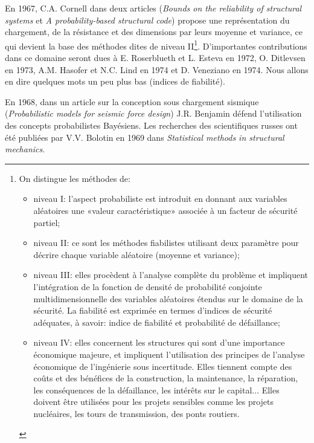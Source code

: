 \begin{histoire}
En 1967, C.A. Cornell dans deux articles (\emph{Bounds on the reliability of structural systems} et \emph{A probability-based structural code}) propose une représentation du chargement, de la résistance et des dimensions par leurs moyenne et variance, ce qui devient la base des méthodes dites de niveau II\footnote{On distingue les méthodes de:
\begin{itemize}
   \item niveau I: l'aspect probabiliste est introduit en donnant aux variables aléatoires une «valeur caractéristique» associée à un facteur de sécurité partiel;
   \item niveau II: ce sont les méthodes fiabilistes utilisant deux paramètre pour décrire chaque variable aléatoire (moyenne et variance);
   \item niveau III: elles procèdent à l'analyse complète du problème et impliquent l'intégration de la fonction de densité de probabilité conjointe multidimensionnelle des variables aléatoires étendus sur le domaine de la sécurité. La fiabilité est exprimée en termes d'indices de sécurité adéquates, à savoir: indice de fiabilité et probabilité de défaillance;
   \item niveau IV: elles concernent les structures qui sont d'une importance économique majeure, et impliquent l'utilisation des principes de l'analyse économique de l'ingénierie sous incertitude. Elles tiennent compte des coûts et des bénéfices de la construction, la maintenance, la réparation, les conséquences de la défaillance, les intérêts sur le capital... Elles doivent être utilisées pour les projets sensibles comme les projets nucléaires, les tours de transmission, des ponts routiers.   
\end{itemize}}.
D'importantes contributions dans ce domaine seront dues à E. Roserblueth et L. Esteva en 1972, O. Ditlevsen en 1973, A.M. Hasofer et N.C. Lind en 1974 et D. Veneziano en 1974. Nous allons en dire quelques mots un peu plus bas (indices de fiabilité).

En 1968, dans un article sur la conception sous chargement sismique (\emph{Probabilistic models for seismic force design}) J.R. Benjamin défend l'utilisation des concepts probabilistes Bayésiens.
Les recherches des scientifiques russes ont été publiées par V.V. Bolotin en 1969 dans \emph{Statistical methods in structural mechanics}.


\end{histoire}
